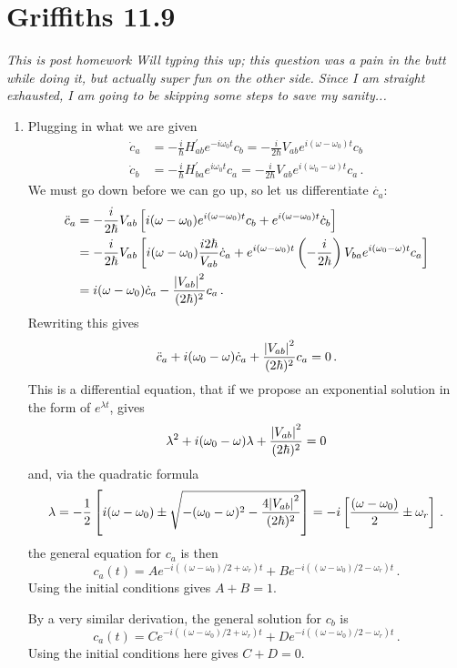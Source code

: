 \documentclass[11pt]{article}
\begin{document}
\section*{Griffiths 11.9}
\textit{This is post homework Will typing this up; this question was a pain in the butt while doing it, but actually super fun on the other side. Since I am straight exhausted, I am going to be skipping some steps to save my sanity...}
\begin{enumerate}[label=\alph*)]
\item Plugging in what we are given
\begin{align*}
\dot{c}_a & = -\frac{i}{\hbar}H^\prime_{ab}e^{-i\omega_0 t}c_b  = -\frac{i}{2\hbar}V_{ab}e^{i(\omega - \omega_0)t}c_b\\
\dot{c}_b & = -\frac{i}{\hbar}H^\prime_{ba}e^{i\omega_0 t}c_a  = -\frac{i}{2\hbar}V_{ab}e^{i(\omega_0 - \omega)t}c_a \, .
\end{align*}
We must go down before we can go up, so let us differentiate $\dot{c_a}$:
\begin{align*}
\ddot{c}_a &= -\frac{i}{2\hbar}V_{ab}\left[i(\omega-\omega_0)e^{i(\omega-\omega_0)t}c_b + e^{i(\omega-\omega_0)t}\dot{c}_b\right]\\
& = - \frac{i}{2\hbar}V_{ab}\left[i(\omega-\omega_0)\frac{i2\hbar}{V_{ab}}\dot{c}_a + e^{i(\omega-\omega_0)t}\left(-\frac{i}{2\hbar}\right)V_{ba}e^{i(\omega_0-\omega)t}c_a\right]\\
& = i(\omega-\omega_0)\dot{c}_a - \frac{\abs{V_{ab}}^2}{(2\hbar)^2}c_a \, . 
\end{align*}
Rewriting this gives
\[\ddot{c}_a + i(\omega_0-\omega)\dot{c}_a +\frac{\abs{V_{ab}}^2}{(2\hbar)^2}c_a = 0 \, . \]
This is a differential equation, that if we propose an exponential solution in the form of $e^{\lambda t}$, gives
\[\lambda^2 + i(\omega_0-\omega)\lambda +\frac{\abs{V_{ab}}^2}{(2\hbar)^2} = 0\]
and, via the quadratic formula
\[\lambda = -\frac{1}{2} \left[i(\omega-\omega_0)\pm \sqrt{-(\omega_0-\omega)^2 - \frac{4\abs{V_{ab}}^2}{(2\hbar)^2}}\right] = -i\left[\frac{(\omega - \omega_0)}{2} \pm \omega_r\right] \, .\]
the general equation for $c_a$ is then
\[c_a(t) = Ae^{-i((\omega - \omega_0)/2 + \omega_r)t} + Be^{-i((\omega - \omega_0)/2 - \omega_r)t} \, .\]
Using the initial conditions gives $A+B = 1$.

By a very similar derivation, the general solution for $c_b$ is 
\[c_a(t) = Ce^{-i((\omega - \omega_0)/2 + \omega_r)t} + De^{-i((\omega - \omega_0)/2 - \omega_r)t} \, .\]
Using the initial conditions here gives $C+D = 0$.


\end{enumerate}
\end{document}
